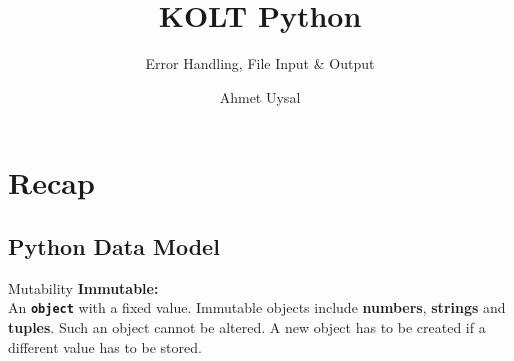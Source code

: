 
\usepackage{../KU-Beamer-Template/style/koc} 
\usepackage{minted}
\usepackage{upquote}
\usepackage{graphicx}
\usepackage{tikz}
\usetikzlibrary{shapes.symbols,positioning, chains}

\title{KOLT Python}
\subtitle{Error Handling, File Input \& Output} 
\date{}
\author{Ahmet Uysal}




    \maketitle


    \section*{Recap}

    \subsection{Python Data Model}

    \begin{frame}{Mutability}
        \huge
        \textbf{Immutable:}\\
        \LARGE
        An \texttt{\textbf{object}} with a fixed value.
        \pause
         Immutable objects include \textbf{numbers}, \textbf{strings} and \textbf{tuples}. Such an object cannot be altered.
        \pause
         A new object has to be created if a different value has to be stored.
        \pause
        \Large
        \begin{columns}
            \begin{column}{0.2\textwidth}
                \inputminted[frame=single,framesep=2pt]{python3}{../Lecture6/code-examples/value_update.py}
            \end{column}
            \begin{column}{0.75\textwidth}
                \inputminted[frame=single,framesep=2pt]{python3}{../Lecture6/code-examples/change_string.py}
            \end{column}
        \end{columns}
    \end{frame}

